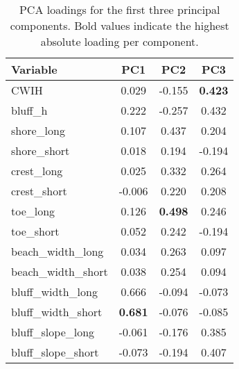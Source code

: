 \begin{table}[htbp]
\centering
\caption{PCA loadings for the first three principal components. Bold values indicate the highest absolute loading per component.}
\label{tab:pca_loadings}
\begin{tabular}{l S S S}
\toprule
Variable & {PC1} & {PC2} & {PC3} \\
\midrule
CWIH              &  0.029 & -0.155 &  \textbf{0.423} \\
bluff\_h          &  0.222 & -0.257 &  0.432 \\
shore\_long       &  0.107 &  0.437 &  0.204 \\
shore\_short      &  0.018 &  0.194 & -0.194 \\
crest\_long       &  0.025 &  0.332 &  0.264 \\
crest\_short      & -0.006 &  0.220 &  0.208 \\
toe\_long         &  0.126 & \textbf{0.498} &  0.246 \\
toe\_short        &  0.052 &  0.242 & -0.194 \\
beach\_width\_long  &  0.034 &  0.263 &  0.097 \\
beach\_width\_short &  0.038 &  0.254 &  0.094 \\
bluff\_width\_long  &  0.666 & -0.094 & -0.073 \\
bluff\_width\_short &  \textbf{0.681} & -0.076 & -0.085 \\
bluff\_slope\_long  & -0.061 & -0.176 &  0.385 \\
bluff\_slope\_short & -0.073 & -0.194 &  0.407 \\
\bottomrule
\end{tabular}
\end{table}
